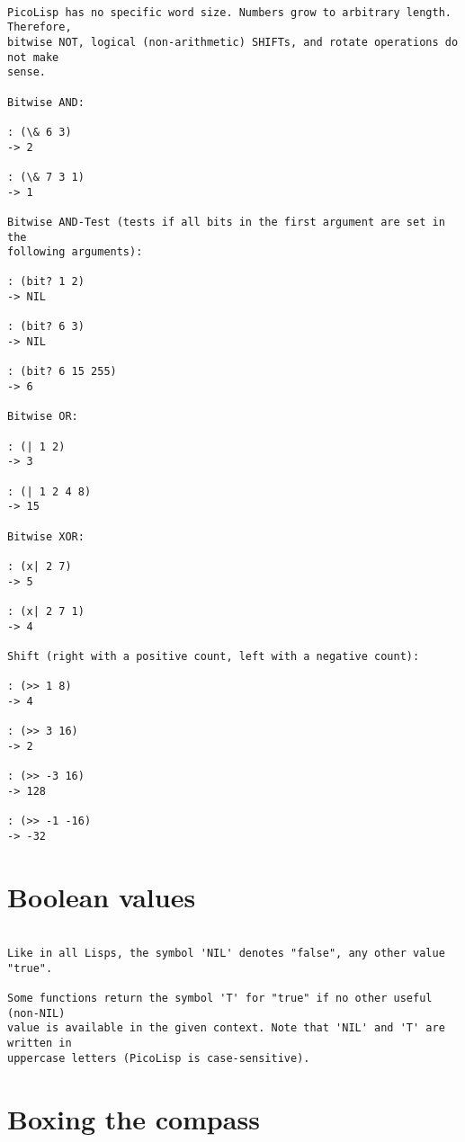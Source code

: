 \begin{verbatim}

PicoLisp has no specific word size. Numbers grow to arbitrary length. Therefore,
bitwise NOT, logical (non-arithmetic) SHIFTs, and rotate operations do not make
sense.

Bitwise AND:

: (\& 6 3)
-> 2

: (\& 7 3 1)
-> 1

Bitwise AND-Test (tests if all bits in the first argument are set in the
following arguments):

: (bit? 1 2)
-> NIL

: (bit? 6 3)
-> NIL

: (bit? 6 15 255)
-> 6

Bitwise OR:

: (| 1 2)
-> 3

: (| 1 2 4 8)
-> 15

Bitwise XOR:

: (x| 2 7)
-> 5

: (x| 2 7 1)
-> 4

Shift (right with a positive count, left with a negative count):

: (>> 1 8)
-> 4

: (>> 3 16)
-> 2

: (>> -3 16)
-> 128

: (>> -1 -16)
-> -32

\end{verbatim}

\section*{Boolean values}

\begin{verbatim}

Like in all Lisps, the symbol 'NIL' denotes "false", any other value "true".

Some functions return the symbol 'T' for "true" if no other useful (non-NIL)
value is available in the given context. Note that 'NIL' and 'T' are written in
uppercase letters (PicoLisp is case-sensitive).

\end{verbatim}

\section*{Boxing the compass}

